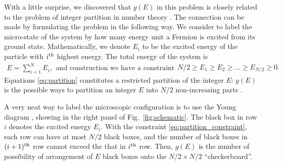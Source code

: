 \documentclass[aps,showpacs,twocolumn,floatfix,prx,superscriptaddress]{revtex4-1}
\begin{document}
With a little surprise, we discovered that $g(E)$ in this problem is closely
related to the problem of integer partition in number theory
\cite{Andrews1998}. The connection can be made by formulating the problem
in the following way. We consider to label the micro-state of the system by how
many energy unit a Fermion is excited from its ground state. Mathematically, we
denote $E_i$ to be the excited energy of the particle with $i^{\rm th}$ highest
energy. The total energy of the system is
\begin{subequations} 
    \label{eq:partition}
    \begin{align}
        E= \sum_{i=1}^{N} E_i,
    \end{align}
\text{and construction we have a constraint}
    \begin{align}
        \label{eq:partition_constraint}
        N/2 \ge E_1 \ge E_2 \ge \ldots \ge E_{N/2} \ge 0. 
    \end{align}
\end{subequations}
Equations \eqref{eq:partition} constitutes a restricted partition of the integer
$E$: $g(E)$ is the possible ways to partition an integer $E$ into $N/2$
non-increasing parts \cite{Andrews1998}.

A very neat way to label the microscopic configuration is to use the Young
diagram \cite{Andrews1998}, showing in the right panel of Fig.~\ref{fig:schematic}. The
black box in row $i$ denotes the excited energy $E_i$. With the constraint
\eqref{eq:partition_constraint}, each row can have at most $N/2$ black boxes,
and the number of black boxes in $(i+1)^{\rm th}$ row cannot exceed the that in
$i^{\rm th}$ row.  Then, $g(E)$ is the number of possibility of arrangement of
$E$ black boxes onto the $N/2 \times N/2$ ``checkerboard''.
\end{document}
